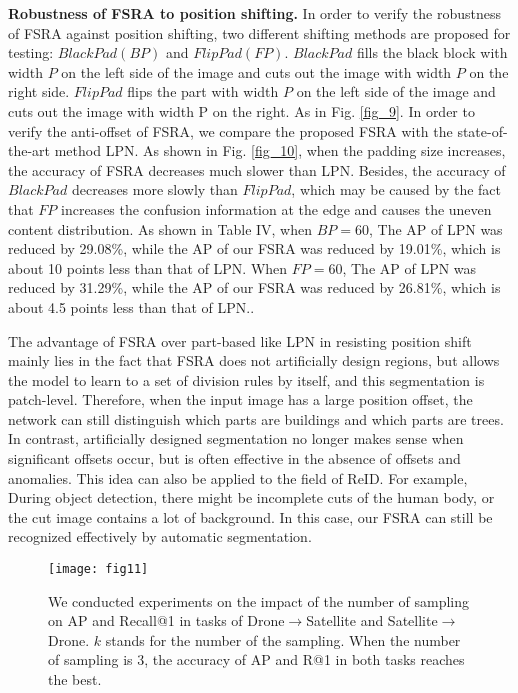 \documentclass[lettersize,journal]{IEEEtran}
\begin{document}
\textbf{Robustness of FSRA to position shifting.} In order to verify the robustness of FSRA against position shifting, two different shifting methods are proposed for testing: $Black Pad (BP)$ and $Flip Pad (FP)$. $Black Pad$ fills the black block with width $P$ on the left side of the image and cuts out the image with width $P$ on the right side. $Flip Pad$ flips the part with width $P$ on the left side of the image and cuts out the image with width P on the right. As in Fig. \ref{fig_9}. In order to verify the anti-offset of FSRA, we compare the proposed FSRA with the state-of-the-art method LPN. As shown in Fig. \ref{fig_10}, when the padding size increases, the accuracy of FSRA decreases much slower than LPN. Besides, the accuracy of $Black Pad$ decreases more slowly than $Flip Pad$, which may be caused by the fact that $FP$ increases the confusion information at the edge and causes the uneven content distribution. As shown in Table IV, when $BP=60$, The AP of LPN was reduced by 29.08\%, while the AP of our FSRA was reduced by 19.01\%, which is about 10 points less than that of LPN. When $FP=60$, The AP of LPN was reduced by 31.29\%, while the AP of our FSRA was reduced by 26.81\%, which is about 4.5 points less than that of LPN..  



The advantage of FSRA over part-based like LPN in resisting position shift mainly lies in the fact that FSRA does not artificially design regions, but allows the model to learn to a set of division rules by itself, and this segmentation is patch-level. Therefore, when the input image has a large position offset, the network can still distinguish which parts are buildings and which parts are trees. In contrast, artificially designed segmentation no longer makes sense when significant offsets occur, but is often effective in the absence of offsets and anomalies. This idea can also be applied to the field of ReID. For example, During object detection, there might be incomplete cuts of the human body, or the cut image contains a lot of background. In this case, our FSRA can still be recognized effectively by automatic segmentation.

\begin{figure}[!t]
\centering
\texttt{[image: fig11]}
\caption{We conducted experiments on the impact of the number of sampling on AP and Recall@1 in tasks of Drone$\rightarrow$Satellite and Satellite$\rightarrow$Drone. $k$ stands for the number of the sampling. When the number of sampling is 3, the accuracy of AP and R@1 in both tasks reaches the best.}
\label{fig_11}
\end{figure}
\end{document}
